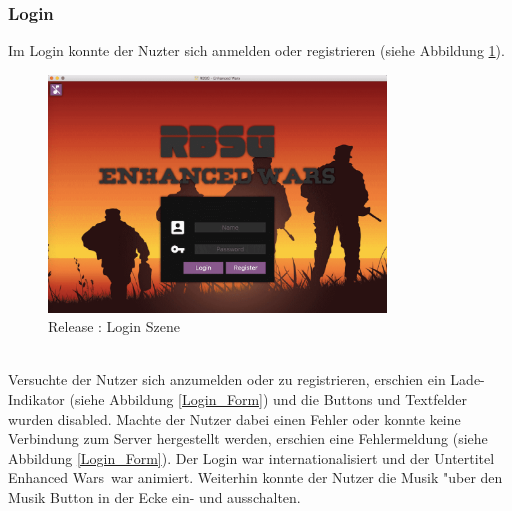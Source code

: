 \documentclass[12pt, titlepage]{scrartcl}
\newcommand{\RN}[1]{%
	\textup{\uppercase\expandafter{\romannumeral#1}}%
}
\begin{document}
            \subsubsection{Login}
                Im Login konnte der Nuzter sich anmelden oder registrieren (siehe Abbildung \ref{Login}). \\
                \begin{figure}[H] 
    				\centering
    				\includegraphics[width=0.8\textwidth]{images/old_state/login/Login.png}
    				\caption{Release \RN{2}: Login Szene}
    				\label{Login}
			    \end{figure}
			    \ \\ Versuchte der Nutzer sich anzumelden oder zu registrieren, erschien ein Lade-Indikator (siehe Abbildung \ref{Login_Form}) und die Buttons und Textfelder wurden disabled. Machte der Nutzer dabei einen Fehler oder konnte keine Verbindung zum Server hergestellt werden, erschien eine Fehlermeldung (siehe Abbildung \ref{Login_Form}). Der Login war internationalisiert und der Untertitel \glqq Enhanced Wars\grqq\ war animiert. Weiterhin konnte der Nutzer die Musik "uber den Musik Button in der Ecke ein- und ausschalten. \\
\end{document}
